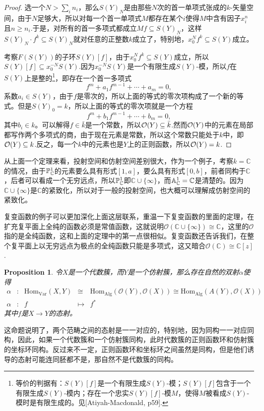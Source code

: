 \documentclass[9pt]{extbook}
\theoremstyle{plain}%
\newtheorem{pro}[defi]{Proposition}%
\begin{document}
\begin{proof}
	选一个$N>\sum_i n_i$，那么$S(Y)_N$是由那些$N$次的首一单项式张成的$k$-矢量空间，由于$N$足够大，所以对每一个首一单项式$M$都存在某个$i$使得$M$中含有因子$x^n_i$且$n\geq n_i$.于是，对所有的首一多项式都成立$Mf\subseteq S(Y)_N$，这样$S(Y)_N\cdot f^k\subseteq S(Y)_N$就对任意的正整数$k$成立了，特别地，$x_0^Nf^k\subseteq S(Y)$成立。

	考察$F(S(Y))$的子环$S(Y)[f]$，由于$x_0^Nf^k\subseteq S(Y)$成立，所以$S(Y)[f]\subseteq x_0^{-N}S(Y)$.因为$x_0^{-N}S(Y)$是一个有限生成$S(Y)$-模，所以$f$在$S(Y)$上是整的\footnote{等价的判据有：$S(Y)[f]$是一个有限生成$S(Y)$-模；$S(Y)[f]$包含于一个有限生成$S(Y)$-模内；存在一个忠实$S(Y)[f]$-模$M$，使得$M$被看成$S(Y)$-模时是有限生成的。见[Atiyah-Macdonald, p59].}，即存在一个首一多项式
	\[
		f^m+a_1f^{m-1}+\cdots+a_m=0,
	\]
	系数$a_i\in S(Y)$，由于$f$是零次的，所以上面的等式的零次项构成了一个新的等式。但是$S(Y)_0=k$，所以上面的等式的零次项就是一个方程
	\[
		f^m+b_1f^{m-1}+\cdots+b_m=0,
	\]
	其中$b_i\in k$。可以解得$f\in \bar{k}$是一个常数，所以$\mathcal{O}(Y)\subseteq \bar{k}$.然而$\mathcal{O}(Y)$中的元素在局部都写作两个多项式的商，由于现在元素是常数，所以这个常数只能处于$k$中，即$\mathcal{O}(Y)\subseteq k$.反之，每一个$k$中的元素也是$Y$上的正则函数，所以$\mathcal{O}(Y)= k$.
\end{proof}

从上面一个定理来看，投射空间和仿射空间差别很大，作为一个例子，考察$k=\mathbb{C}$的情况，由于$\mathbb{P}^1_{\mathbb{C}}$的元素要么具有形式$[1,a]$，要么具有形式$[0,b]$，前者同构于$\mathbb{C}$，后者可以看成一个无穷远点，所以$\mathbb{P}^1_{\mathbb{C}}$即$\mathbb{C}\cup \{\infty\}$，而$\mathbb{A}^1_{\mathbb{C}}=\mathbb{C}$是清楚的。因为$\mathbb{C}\cup \{\infty\}$是$\mathbb{C}$的紧致化，所以对于一般的投射空间，也大概可以理解成仿射空间的紧致化。

复变函数的例子可以更加深化上面这层联系，重温一下复变函数的里面的定理，在扩充复平面上全纯的函数必须是常值函数，这就说明$\mathcal{O}(\mathbb{C}\cup \{\infty\})\cong \mathbb{C}$，这里的$\mathcal{O}$指的是全纯函数，这和上面的定理中的第一点很相似。复变函数还告诉我们，在整个复平面上以无穷远点为极点的全纯函数只能是多项式，这又暗合$\mathcal{O}(\mathbb{C})\cong \mathbb{C}[z]$.

\begin{pro}
令$X$是一个代数簇，而$Y$是一个仿射簇，那么存在自然的双射$\alpha$使得
\[
\begin{array}{lcccl}
	\alpha&:&\mathrm{Hom}_{\mathrm{Var}}(X,Y)&\cong& \mathrm{Hom}_{\mathrm{Alg}}(\mathcal{O}(Y),\mathcal{O}(X))\cong \mathrm{Hom}_{\mathrm{Alg}}(A(Y),\mathcal{O}(X))\\
	\alpha&:&f&\mapsto &f^*
\end{array}
\]
其中$f$是$X\to Y$的态射。
\label{c3:p14}
\end{pro}
这命题说明了，两个范畴之间的态射是一一对应的，特别地，因为同构一一对应同构，因此，如果一个代数簇和一个仿射簇同构，此时代数簇的正则函数环和仿射簇的坐标环同构。反过来不一定，正则函数环和坐标环之间虽然是同构，但是他们诱导的态射可能连同胚都不是，那自然不是代数簇的同构。
\end{document}
